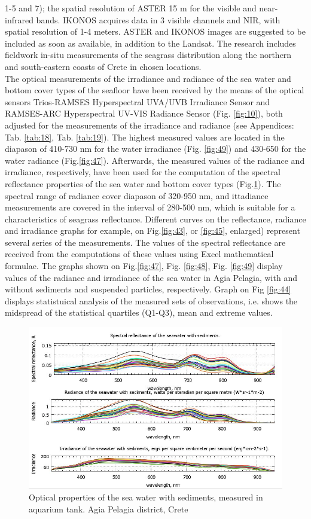 \documentclass[10pt, a4paper]{article}
\begin{document}
1-5 and 7); the spatial resolution of ASTER 15 m for the visible and near-infrared bands. IKONOS
acquires data in 3 visible channels and NIR, with spatial resolution of 1-4 meters. ASTER and
IKONOS images are suggested to be included as soon as available, in addition to the Landsat. The
research includes fieldwork in-situ measurements of the seagrass distribution along the northern and
south-eastern coasts of Crete in chosen locations.\\
The optical measurements of the irradiance and radiance of the sea water and bottom cover types of
the seafloor have been received by the means of the optical sensors Trios-RAMSES Hyperspectral
UVA/UVB Irradiance Sensor and RAMSES-ARC Hyperspectral UV-VIS Radiance Sensor (Fig. \ref{fig:10}), both adjusted for the measurements of the irradiance and radiance (see Appendices: Tab. \ref{tab:18}, Tab. \ref{tab:19}).
The highest measured values are located in the diapason of 410-730 nm for the water irradiance (Fig. \ref{fig:49}) and 430-650 for the water radiance (Fig.\ref{fig:47}). 
Afterwards, the measured values of the
radiance and irradiance, respectively, have been used for the computation of the spectral reflectance
properties of the sea water and bottom cover types (Fig.\ref{fig:23}). The spectral range of radiance
cover diapason of 320-950 nm, and ittadiance measurements are covered in the interval of 280-500
nm, which is suitable for a characteristics of seagrass reflectance.
Different curves on the reflectance, radiance and irradiance graphs for example, on Fig.\ref{fig:43}, or \ref{fig:45}, enlarged) represent several series of
the measurements. The values of the spectral reflectance are received from the
computations of these values using Excel mathematical formulae. The graphs shown on Fig.\ref{fig:47}, Fig. \ref{fig:48}, Fig. \ref{fig:49} display values of the radiance and irradiance of the sea water in Agia Pelagia, with and without sediments and suspended particles, respectively. Graph on Fig \ref{fig:44} displays statistuical analysis of the measured sets of observations, i.e. shows the midspread of the statistical quartiles (Q1-Q3), mean and extreme values.
\begin{figure}[h]
\centering
\includegraphics[scale=0.5]{GNU-17.jpg}
\caption{Optical properties of the sea water with sediments, measured in aquarium tank. Agia Pelagia district, Crete}
\label{fig:23}
\end{figure}
\pagebreak
\end{document}
